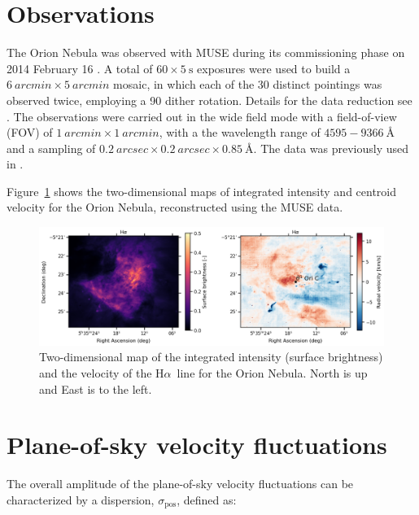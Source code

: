 \documentclass[fleqn,usenatbib, useAMS, a4paper]{mnras}
\newcommand\pos{\ensuremath{_{\mathrm{pos}}}}
\newcommand\halpha{H${\alpha}$}
\begin{document}
\section{Observations}\label{sec:observations}

The Orion Nebula was observed with MUSE during its commissioning phase on 2014 February 16 \citep{2014Msngr.157...13B}.
A total of \(  60 \times 5 \ \text{s}\) exposures were used to build a \(\SI{6}{arcmin} \times \SI{5}{arcmin}\) mosaic, in which each of the 30 distinct pointings was observed twice, employing a 90\textdegree{} dither rotation.
Details for the data reduction see \citep{2015A&A...582A.114W}.
The observations were carried out in the wide field mode with a field-of-view (FOV) of \(\SI{1}{arcmin} \times \SI{1}{arcmin}\), with a the wavelength range of \(4595-  \SI{9366}{\angstrom} \) and a sampling of \(\SI{0.2}{arcsec} \times \SI{0.2}{arcsec} \times \SI{0.85}{\angstrom}  \). 
The data was previously used in \citet{2016MNRAS.455.4057M}.

Figure~\ref{fig:H_I-6563_maps} shows the two-dimensional maps of integrated intensity and centroid velocity for the Orion Nebula, reconstructed using the MUSE data.



\begin{figure}
 \centering
 \includegraphics[width=6.5in]{figures/H_I-6563.png}\par
 \caption{
 Two-dimensional map of the integrated intensity (surface brightness) and the  velocity of the \halpha\ line for the Orion Nebula. 
 North is up and East is to the left.
 }
\label{fig:H_I-6563_maps}
\end{figure}


\section{Plane-of-sky velocity fluctuations}\label{sec:met}

The overall amplitude of the plane-of-sky velocity fluctuations can be characterized by a dispersion, \(\sigma\pos\), defined as:
\end{document}
